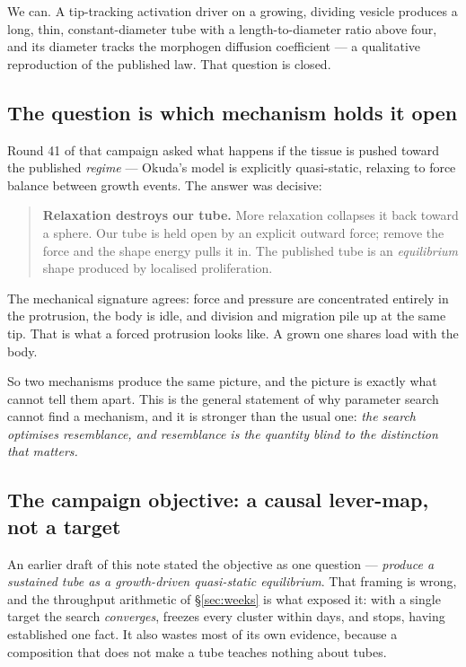 \documentclass[11pt]{article}
\begin{document}
We can. A tip-tracking activation driver on a growing, dividing vesicle produces a long, thin,
constant-diameter tube with a length-to-diameter ratio above four, and its diameter tracks the
morphogen diffusion coefficient --- a qualitative reproduction of the published law. That
question is closed.

\subsection{The question is which mechanism holds it open}

Round 41 of that campaign asked what happens if the tissue is pushed toward the published
\emph{regime} --- Okuda's model is explicitly quasi-static, relaxing to force balance between
growth events. The answer was decisive:

\begin{quote}
\textbf{Relaxation destroys our tube.} More relaxation collapses it back toward a sphere. Our
tube is held open by an explicit outward force; remove the force and the shape energy pulls it
in. The published tube is an \emph{equilibrium} shape produced by localised proliferation.
\end{quote}

The mechanical signature agrees: force and pressure are concentrated entirely in the protrusion,
the body is idle, and division and migration pile up at the same tip. That is what a forced
protrusion looks like. A grown one shares load with the body.

So two mechanisms produce the same picture, and the picture is exactly what cannot tell them
apart. This is the general statement of why parameter search cannot find a mechanism, and it is
stronger than the usual one: \emph{the search optimises resemblance, and resemblance is the
quantity blind to the distinction that matters.}

\subsection{The campaign objective: a causal lever-map, not a target}

An earlier draft of this note stated the objective as one question --- \emph{produce a sustained
tube as a growth-driven quasi-static equilibrium}. That framing is wrong, and the throughput
arithmetic of \S\ref{sec:weeks} is what exposed it: with a single target the search
\emph{converges}, freezes every cluster within days, and stops, having established one fact.
It also wastes most of its own evidence, because a composition that does not make a tube teaches
nothing about tubes.
\end{document}
